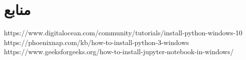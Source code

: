 \documentclass{article}
\begin{document}
\section*{منابع}
\renewcommand{\section}[2]{}%
\begin{thebibliography}{99} %


\begin{LTRitems}

\resetlatinfont

https://www.digitalocean.com/community/tutorials/install-python-windows-10
https://phoenixnap.com/kb/how-to-install-python-3-windows
https://www.geeksforgeeks.org/how-to-install-jupyter-notebook-in-windows/

\end{LTRitems}

\end{thebibliography}
\end{document}
